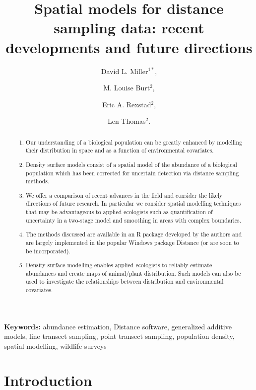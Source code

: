 \documentclass[a4paper,12pt]{article}
\title{Spatial models for distance sampling data: recent developments and future directions}
\author{
David L. Miller$^{1*}$, \and
M. Louise Burt$^{2}$, \and
Eric A. Rexstad$^{2}$, \and 
Len Thomas$^{2}$.}
\begin{document}
\maketitle

\begin{abstract}
  \noindent 

\begin{enumerate}
	\item Our understanding of a biological population can be greatly enhanced by modelling their distribution in space and as a function of environmental covariates. 
	\item Density surface models consist of a spatial model of the abundance of a biological population which has been corrected for uncertain detection via distance sampling methods. 
	\item We offer a comparison of recent advances in the field and consider the likely directions of future research. In particular we consider spatial modelling techniques that may be advantageous to applied ecologists such as quantification of uncertainty in a two-stage model and smoothing in areas with complex boundaries.
	\item The methods discussed are available in an \textsf{R} package developed by the authors and are largely implemented in the popular Windows package Distance (or are soon to be incorporated).
	\item Density surface modelling enables applied ecologists to reliably estimate abundances and create maps of animal/plant distribution. Such models can also be used to investigate the relationships between distribution and environmental covariates.
\end{enumerate}
 

\end{abstract}

\noindent \textbf{Keywords:} abundance estimation, Distance software, generalized additive models, line transect sampling, point transect sampling, population density, spatial modelling, wildlife surveys


\newpage

\section*{Introduction}
\label{s:intro}
\end{document}
